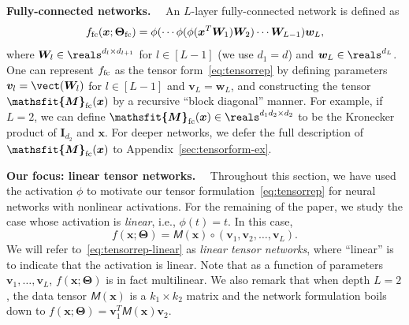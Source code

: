 \documentclass{article} %
\def\vv{{\bm{v}}}
\def\vw{{\bm{w}}}
\def\vx{{\bm{x}}}
\def\mI{{\bm{I}}}
\def\mW{{\bm{W}}}
\newcommand{\tens}[1]{\bm{\mathsfit{#1}}}
\def\tM{{\tens{M}}}
\newcommand{\bTheta}{\bm{\Theta}}
\newcommand{\bThetafc}{\bTheta_{\rm fc}}
\newcommand{\ffc}{f_{\rm fc}}
\newcommand{\tMfc}{\tM_{\rm fc}}
\begin{document}
\textbf{Fully-connected networks.}~~
An $L$-layer fully-connected network is defined as
\begin{equation}
\label{eq:fcnet}
    \ffc (\vx; \bThetafc) = \phi(\cdots\phi (\phi(\vx^T \mW_1) \mW_2)\cdots \mW_{L-1}) \vw_L,
\end{equation}
where $\mW_l \in \reals^{d_{l} \times d_{l+1}}$ for $l \in [L-1]$ (we use $d_1 = d$) and $\vw_L \in \reals^{d_{L}}$.
One can represent $\ffc$ as the tensor form~\eqref{eq:tensorrep} by defining parameters $\vv_l = \vect(\mW_l)$ for $l \in [L-1]$ and $\vv_L = \vw_L$, and constructing the tensor $\tMfc(\vx)$ by a recursive ``block diagonal'' manner.
For example, if $L = 2$, we can define $\tMfc(\vx) \in \reals^{d_1 d_2 \times d_2}$ to be the Kronecker product of $\mI_{d_2}$ and $\vx$. For deeper networks, we defer the full description of $\tMfc(\vx)$ to Appendix~\ref{sec:tensorform-ex}.

\textbf{Our focus: linear tensor networks.}~~
Throughout this section, we have used the activation $\phi$ to motivate our tensor formulation~\eqref{eq:tensorrep} for neural networks with nonlinear activations. For the remaining of the paper, we study the case whose activation is \emph{linear}, i.e., $\phi(t) = t$. In this case, 
\begin{equation}
\label{eq:tensorrep-linear}
    f(\vx;\bTheta) = \tM(\vx) \circ (\vv_1, \vv_2, \dots, \vv_L).
\end{equation}
We will refer to~\eqref{eq:tensorrep-linear} as \emph{linear tensor networks}, where ``linear'' is to indicate that the activation is linear.
Note that as a function of parameters $\vv_1, \dots, \vv_L$, $f(\vx;\bTheta)$ is in fact multilinear.
We also remark that when depth $L=2$, the data tensor $\tM(\vx)$ is a $k_1 \times  k_2$ matrix and the network formulation boils down to $f(\vx;\bTheta) = \vv_1 ^T \tM(\vx) \vv_2$.
\end{document}
